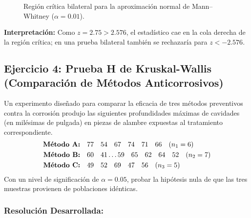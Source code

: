 \documentclass[11pt,a4paper]{article}
\begin{document}
\begin{figure}[htbp]
\centering
{}
\caption{Región crítica bilateral para la aproximación normal de Mann--Whitney ($\alpha=0.01$).}
\label{fig:normal_mann_whitney}
\end{figure}
\textbf{Interpretación:} Como $z=2.75>2.576$, el estadístico cae en la cola derecha de la región crítica; en una prueba bilateral también se rechazaría para $z<-2.576$.
\subsection{Ejercicio 4: Prueba H de Kruskal-Wallis (Comparación de Métodos Anticorrosivos)} \label{ej:kruskal_h}

\begin{tcolorbox}[colback=white,colframe=blue!60!black,title=Enunciado]
    Un experimento diseñado para comparar la eficacia de tres métodos preventivos contra la corrosión produjo las siguientes profundidades máximas de cavidades (en milésimas de pulgada) en piezas de alambre expuestas al tratamiento correspondiente.
    \begin{align*}
        \text{\textbf{Método A:}} & \quad 77 \quad 54 \quad 67 \quad 74 \quad 71 \quad 66 \quad (n_1 = 6) \\
        \text{\textbf{Método B:}} & \quad 60 \quad 41 \dots 59 \quad 65 \quad 62 \quad 64 \quad 52 \quad (n_2 = 7) \\
        \text{\textbf{Método C:}} & \quad 49 \quad 52 \quad 69 \quad 47 \quad 56 \quad (n_3 = 5)
    \end{align*}
    Con un nivel de significación de $\alpha = 0.05$, probar la hipótesis nula de que las tres muestras provienen de poblaciones idénticas.
\end{tcolorbox}

\subsubsection*{Resolución Desarrollada:}
\end{document}
